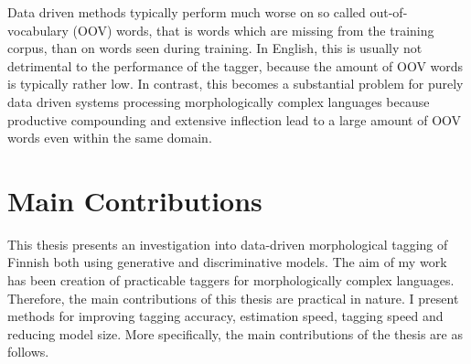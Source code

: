 Data driven methods typically perform much
worse on so called out-of-vocabulary (OOV) words, that is words which
are missing from the training corpus, than on words seen during
training. In English, this is usually not detrimental to the
performance of the tagger, because the amount of OOV words is
typically rather low. In contrast, this becomes a substantial problem
for purely data driven systems processing morphologically complex
languages because productive compounding and extensive inflection lead
to a large amount of OOV words even within the same domain.


\section{Main Contributions}

This thesis presents an investigation into data-driven morphological
tagging of Finnish both using generative and discriminative
models. The aim of my work has been creation of practicable taggers
for morphologically complex languages. Therefore, the main contributions
of this thesis are practical in nature. I present methods for
improving tagging accuracy, estimation speed, tagging speed and reducing
model size. More specifically, the main contributions of the thesis
are as follows.

